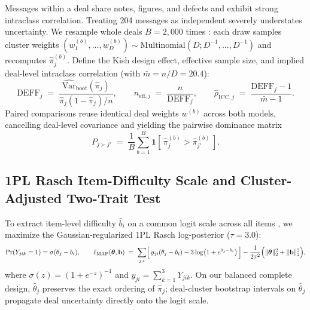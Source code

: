 \documentclass[10.5pt]{article}
\theoremstyle{definition}
\begin{document}
Messages within a deal share notes, figures, and defects and exhibit strong intraclass correlation. Treating 204 messages as independent severely understates uncertainty. We resample whole deals $B = 2{,}000$ times \citep{cameron2008,miller2024errorbars}: each draw samples cluster weights $(w_1^{(b)}, \dots, w_D^{(b)}) \sim \mathrm{Multinomial}(D; D^{-1}, \dots, D^{-1})$ and recomputes $\hat\pi_j^{(b)}$. Define the Kish design effect, effective sample size, and implied deal-level intraclass correlation (with $\bar m = n / D = 20.4$):
\begin{equation}\label{eq:deff}
\mathrm{DEFF}_j \;=\; \frac{\widehat{\mathrm{Var}}_{\text{boot}}(\hat\pi_j)}{\hat\pi_j(1 - \hat\pi_j)/n}, \qquad
n_{\text{eff}, j} \;=\; \frac{n}{\mathrm{DEFF}_j}, \qquad
\hat\rho_{\text{ICC}, j} \;=\; \frac{\mathrm{DEFF}_j - 1}{\bar m - 1}.
\end{equation}
Paired comparisons reuse identical deal weights $w^{(b)}$ across both models, cancelling deal-level covariance and yielding the pairwise dominance matrix
\[
P_{j \succ j'} \;=\; \frac{1}{B}\sum_{b=1}^B \mathbf{1}\!\left[\,\hat\pi_j^{(b)} > \hat\pi_{j'}^{(b)}\,\right].
\]

\subsection{1PL Rasch Item-Difficulty Scale and Cluster-Adjusted Two-Trait Test}

To extract item-level difficulty $\hat b_i$ on a common logit scale across all \NItems{} items \citep{rasch1960,lalor2016,rodriguez2021}, we maximize the Gaussian-regularized 1PL Rasch log-posterior ($\tau = 3.0$):
\begin{equation}\label{eq:map}
\Pr(Y_{jik} = 1) = \sigma(\theta_j - b_i), \qquad
\ell_{\text{MAP}}(\boldsymbol{\theta}, \mathbf{b}) \;=\; \sum_{j,i}\Bigl[\,y_{ji}(\theta_j - b_i) - 3\log\bigl(1 + e^{\theta_j - b_i}\bigr)\,\Bigr] - \frac{1}{2\tau^2}\Bigl(\|\boldsymbol{\theta}\|_2^2 + \|\mathbf{b}\|_2^2\Bigr),
\end{equation}
where $\sigma(z) = (1 + e^{-z})^{-1}$ and $y_{ji} = \sum_{k=1}^3 Y_{jik}$. On our balanced complete design, $\hat\theta_j$ preserves the exact ordering of $\hat\pi_j$; deal-cluster bootstrap intervals on $\hat\theta_j$ propagate deal uncertainty directly onto the logit scale.
\end{document}
